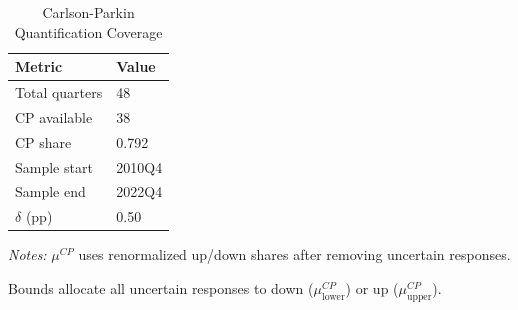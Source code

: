 \begin{table}[!htbp]
\centering
\small
\caption{Carlson-Parkin Quantification Coverage}
\label{tab:cp_coverage}
\begin{threeparttable}

\begin{tabular}{ll}
\toprule
Metric & Value \\
\midrule
Total quarters & 48 \\
CP available & 38 \\
CP share & 0.792 \\
Sample start & 2010Q4 \\
Sample end & 2022Q4 \\
\addlinespace
$\delta$ (pp) & 0.50 \\
\bottomrule
\end{tabular}
\begin{tablenotes}[flushleft]
\footnotesize
\item \textit{Notes:} $\mu^{CP}$ uses renormalized up/down shares after removing uncertain responses.
\item Bounds allocate all uncertain responses to down ($\mu^{CP}_{\text{lower}}$) or up ($\mu^{CP}_{\text{upper}}$).
\end{tablenotes}
\end{threeparttable}
\end{table}
